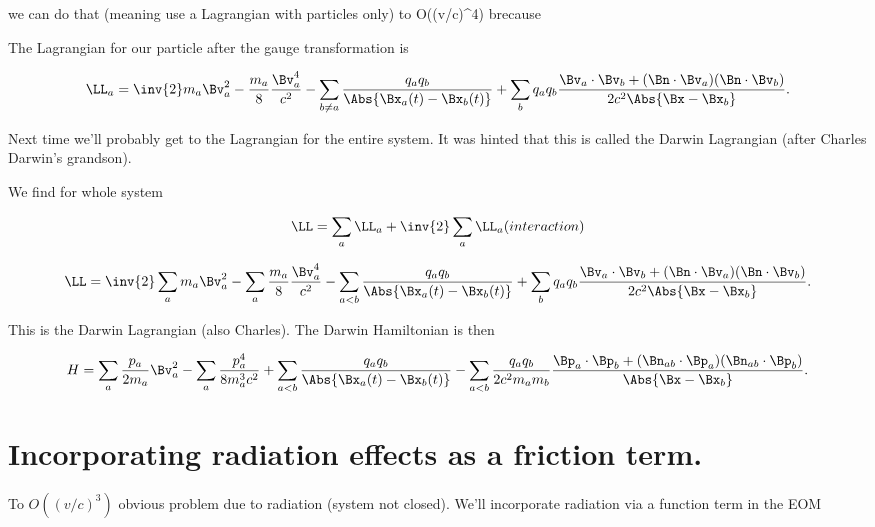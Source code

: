 we can do that (meaning use a Lagrangian with particles only) to O((v/c)^4) brecause 



The Lagrangian for our particle after the gauge transformation is

\begin{equation}\label{eqn:relativisticElectrodynamicsL25:330b}
\LL_a = \inv{2} m_a \Bv_a^2 - \frac{m_a}{8} \frac{\Bv_a^4}{c^2} 
-\sum_{b \ne a} \frac{q_a q_b}{\Abs{\Bx_a(t) - \Bx_b(t)}}
+\sum_b q_a q_b \frac{\Bv_a \cdot \Bv_b + (\Bn \cdot \Bv_a) (\Bn \cdot \Bv_b)}{2 c^2 \Abs{\Bx - \Bx_b} }.
\end{equation}

Next time we'll probably get to the Lagrangian for the entire system.  It was hinted that this is called the Darwin Lagrangian (after Charles Darwin's grandson).

We find for whole system

\begin{equation}\label{eqn:relativisticElectrodynamicsPS6P1:n}
\LL =  \sum_a \LL_a + \inv{2} \sum_a \LL_a (interaction)
\end{equation}

\begin{equation}\label{eqn:relativisticElectrodynamicsPS6P1:n}
\LL = \inv{2} \sum_a m_a \Bv_a^2 - \sum_a \frac{m_a}{8} \frac{\Bv_a^4}{c^2} 
-\sum_{ a < b} \frac{q_a q_b}{\Abs{\Bx_a(t) - \Bx_b(t)}}
+\sum_b q_a q_b \frac{\Bv_a \cdot \Bv_b + (\Bn \cdot \Bv_a) (\Bn \cdot \Bv_b)}{2 c^2 \Abs{\Bx - \Bx_b} }.
\end{equation}

This is the Darwin Lagrangian (also Charles).  The Darwin Hamiltonian is then

\begin{equation}\label{eqn:relativisticElectrodynamicsPS6P1:n}
H = \sum_a \frac{p_a}{2 m_a} \Bv_a^2 - \sum_a \frac{p_a^4}{8 m_a^3 c^2} 
+\sum_{ a < b} \frac{q_a q_b}{\Abs{\Bx_a(t) - \Bx_b(t)}}
- \sum_{ a < b } \frac{q_a q_b}{ 2 c^2 m_a m_b } \frac{\Bp_a \cdot \Bp_b + (\Bn_{a b} \cdot \Bp_a) (\Bn_{ a b } \cdot \Bp_b)}{\Abs{\Bx - \Bx_b} }.
\end{equation}

\section{Incorporating radiation effects as a friction term.}

To $O((v/c)^3)$ obvious problem due to radiation (system not closed).  We'll incorporate radiation via a function term in the EOM

